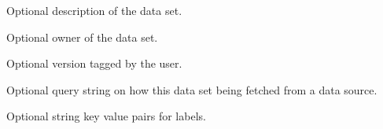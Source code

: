 \documentclass[letterpaper,10pt,english]{sphinxmanual}
\begin{document}
\begin{fulllineitems}
\begin{fulllineitems}
\label{\detokenize{source/md:kubeflow.metadata.metadata.DataSet.description}}
Optional description of the data set.

\end{fulllineitems}


\begin{fulllineitems}
\label{\detokenize{source/md:kubeflow.metadata.metadata.DataSet.owner}}
Optional owner of the data set.

\end{fulllineitems}


\begin{fulllineitems}
\label{\detokenize{source/md:kubeflow.metadata.metadata.DataSet.version}}
Optional version tagged by the user.

\end{fulllineitems}


\begin{fulllineitems}
\label{\detokenize{source/md:kubeflow.metadata.metadata.DataSet.query}}
Optional query string on how this data set being fetched from a data
source.

\end{fulllineitems}


\begin{fulllineitems}
\label{\detokenize{source/md:kubeflow.metadata.metadata.DataSet.labels}}
Optional string key value pairs for labels.

\end{fulllineitems}


\end{fulllineitems}
\end{document}
